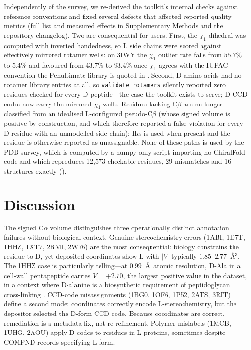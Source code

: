\documentclass[numsec,webpdf,modern,large,namedate]{oup-authoring-template}
\DeclareRobustCommand{\repopath}[1]{\path{#1}}
\begin{document}
Independently of the survey, we re-derived the toolkit's internal checks against reference conventions and fixed several defects that affected reported quality metrics (full list and measured effects in Supplementary Methods and the repository changelog). Two are consequential for users. First, the $\chi_1$ dihedral was computed with inverted handedness, so L side chains were scored against effectively mirrored rotamer wells: on 3IWY the $\chi_1$ outlier rate falls from 55.7\% to 5.4\% and favoured from 43.7\% to 93.4\% once $\chi_1$ agrees with the IUPAC convention the Penultimate library is quoted in \citep{lovell2000}. Second, D-amino acids had no rotamer library entries at all, so \texttt{validate\_rotamers} silently reported zero residues checked for every D-peptide---the case the toolkit exists to serve; D-CCD codes now carry the mirrored $\chi_1$ wells. Residues lacking C$\beta$ are no longer classified from an idealised L-configured pseudo-C$\beta$ (whose signed volume is positive by construction, and which therefore reported a false violation for every D-residue with an unmodelled side chain); H$\alpha$ is used when present and the residue is otherwise reported as unassignable. None of these paths is used by the PDB survey, which is computed by a numpy-only script importing no ChiralFold code and which reproduces 12{,}573 checkable residues, 29 mismatches and 16 structures exactly (\repopath{benchmarks/reproduce_d_residue_errors.py}).

\section{Discussion}

The signed C$\alpha$ volume distinguishes three operationally distinct annotation failures without biological context. Genuine stereochemistry errors (1ABI, 1D7T, 1HHZ, 1XT7, 2RMI, 2W76) are the most consequential: biology constrains the residue to D, yet deposited coordinates show L with $|V|$ typically $1.85$--$2.77$~\AA$^3$. The 1HHZ case is particularly telling---at 0.99~\AA\ atomic resolution, D-Ala in a cell-wall pentapeptide carries $V=+2.70$, the largest positive value in the dataset, in a context where D-alanine is a biosynthetic requirement of peptidoglycan cross-linking \citep{cava2011,miyamoto2021}. CCD-code misassignments (1BG0, 1OF6, 1P52, 2ATS, 3RIT) define a second mode: coordinates correctly encode L-stereochemistry, but the depositor selected the D-form CCD code. Because coordinates are correct, remediation is a metadata fix, not re-refinement. Polymer mislabels (1MCB, 1UHG, 2AOU) apply D-codes to residues in L-proteins, sometimes despite COMPND records specifying L-form.
\end{document}

